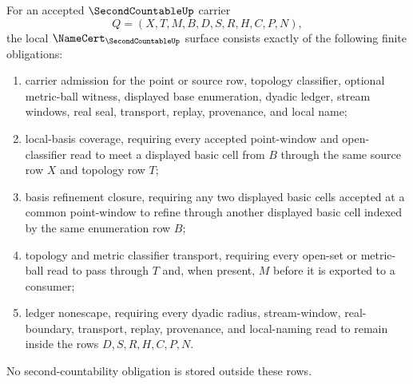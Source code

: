 \begin{theorem}
\label{thm:second-countable-namecert-obligations}
For an accepted $\SecondCountableUp$ carrier
$$
Q=(X,T,M,B,D,S,R,H,C,P,N),
$$
the local $\NameCert_{\SecondCountableUp}$ surface consists exactly of the following finite obligations:
\begin{enumerate}
\item carrier admission for the point or source row, topology classifier, optional metric-ball witness, displayed base enumeration, dyadic ledger, stream windows, real seal, transport, replay, provenance, and local name;
\item local-basis coverage, requiring every accepted point-window and open-classifier read to meet a displayed basic cell from $B$ through the same source row $X$ and topology row $T$;
\item basis refinement closure, requiring any two displayed basic cells accepted at a common point-window to refine through another displayed basic cell indexed by the same enumeration row $B$;
\item topology and metric classifier transport, requiring every open-set or metric-ball read to pass through $T$ and, when present, $M$ before it is exported to a consumer;
\item ledger nonescape, requiring every dyadic radius, stream-window, real-boundary, transport, replay, provenance, and local-naming read to remain inside the rows $D,S,R,H,C,P,N$.
\end{enumerate}
No second-countability obligation is stored outside these rows.
\end{theorem}
